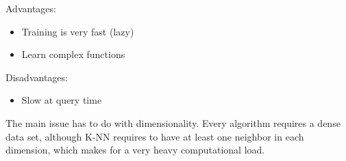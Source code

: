 \documentclass[oneside]{book}
\theoremstyle{definition}
\begin{document}
Advantages:

\begin{itemize}
	\item Training is very fast (lazy)
	\item Learn complex functions
\end{itemize}

Disadvantages:

\begin{itemize}
	\item Slow at query time
\end{itemize}





The main issue has to do with dimensionality. Every algorithm requires a dense data set, although K-NN requires to have at least one neighbor in each dimension, which makes for a very heavy computational load.










\end{document}
